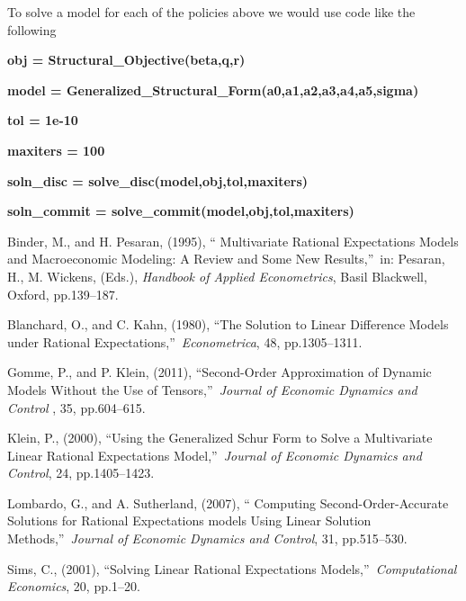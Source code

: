 \documentclass[thmsa,notitlepage,11pt]{article}
\begin{document}
To solve a model for each of the policies above we would use code like the
following

\bigskip

\textbf{obj = Structural\_Objective(beta,q,r)}

\textbf{model = Generalized\_Structural\_Form(a0,a1,a2,a3,a4,a5,sigma)}

\textbf{tol = 1e-10}

\textbf{maxiters = 100}

\textbf{soln\_disc = solve\_disc(model,obj,tol,maxiters)}

\textbf{soln\_commit = solve\_commit(model,obj,tol,maxiters)}

\bigskip

\setlength{\baselineskip}{10pt}

\begin{thebibliography}{9}
\bibitem{} Binder, M., and H. Pesaran, (1995), \textquotedblleft
Multivariate Rational Expectations Models and Macroeconomic Modeling: A
Review and Some New Results,\textquotedblright\ in: Pesaran, H., M. Wickens,
(Eds.), \textit{Handbook of Applied Econometrics}, Basil Blackwell, Oxford,
pp.139--187.

\bibitem{} Blanchard, O., and C. Kahn, (1980), \textquotedblleft The
Solution to Linear Difference Models under Rational
Expectations,\textquotedblright\ \textit{Econometrica}, 48, pp.1305--1311.

\bibitem{} Gomme, P., and P. Klein, (2011), \textquotedblleft Second-Order
Approximation of Dynamic Models Without the Use of
Tensors,\textquotedblright\ \textit{Journal of Economic Dynamics and Control}%
, 35, pp.604--615.

\bibitem{} Klein, P., (2000), \textquotedblleft Using the Generalized Schur
Form to Solve a Multivariate Linear Rational Expectations
Model,\textquotedblright\ \textit{Journal of Economic Dynamics and Control},
24, pp.1405--1423.

\bibitem{} Lombardo, G., and A. Sutherland, (2007), \textquotedblleft
Computing Second-Order-Accurate Solutions for Rational Expectations models
Using Linear Solution Methods,\textquotedblright\ \textit{Journal of
Economic Dynamics and Control}, 31, pp.515--530.

\bibitem{} Sims, C., (2001), \textquotedblleft Solving Linear Rational
Expectations Models,\textquotedblright\ \textit{Computational Economics},
20, pp.1--20.
\end{thebibliography}
\end{document}
